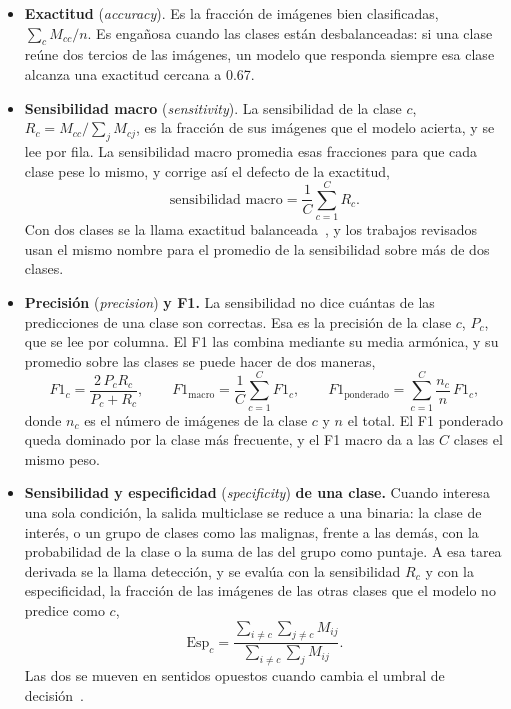 \begin{itemize}
    \item \textbf{Exactitud} (\emph{accuracy}). Es la fracción de imágenes bien clasificadas, $\sum_c M_{cc} / n$.
    Es engañosa
    cuando las clases están desbalanceadas: si una clase reúne dos tercios de las imágenes, un modelo que responda
    siempre esa clase alcanza una exactitud cercana a 0.67.

    \item \textbf{Sensibilidad macro} (\emph{sensitivity}). La sensibilidad de la clase $c$,
    $R_c = M_{cc} / \sum_{j} M_{cj}$, es la
    fracción de sus imágenes que el modelo acierta, y se lee por fila. La sensibilidad macro promedia esas
    fracciones para que cada clase pese lo mismo, y corrige así el defecto de la exactitud,
    \begin{equation}
        \text{sensibilidad macro} = \frac{1}{C}\sum_{c=1}^{C} R_c.
        \label{eq:marco_acc_bal}
    \end{equation}
    Con dos clases se la llama exactitud balanceada~\cite{brodersen2010balanced,sokolova2009systematic}, y los trabajos revisados usan el mismo nombre para el promedio de la sensibilidad sobre más de dos clases.

    \item \textbf{Precisión} (\emph{precision}) \textbf{y F1.} La sensibilidad no dice cuántas de las predicciones
    de una clase son correctas. Esa es la precisión de la clase $c$, $P_c$, que se lee por columna. El F1 las
    combina mediante su media armónica, y su promedio sobre las clases se puede hacer de dos maneras,
    \begin{equation}
        F1_c = \frac{2\,P_c R_c}{P_c + R_c}, \qquad
        F1_{\text{macro}} = \frac{1}{C}\sum_{c=1}^{C} F1_c, \qquad
        F1_{\text{ponderado}} = \sum_{c=1}^{C} \frac{n_c}{n}\, F1_c,
        \label{eq:marco_f1}
    \end{equation}
    donde $n_c$ es el número de imágenes de la clase $c$ y $n$ el total. El F1 ponderado queda dominado por la
    clase más frecuente, y el F1 macro da a las $C$ clases el mismo peso.

    \item \textbf{Sensibilidad y especificidad} (\emph{specificity}) \textbf{de una clase.} Cuando interesa una
    sola condición, la salida multiclase se reduce a una binaria: la clase de interés, o un grupo de clases como las malignas, frente a
    las demás, con la probabilidad de la clase o la suma de las del grupo como puntaje. A esa tarea derivada se
    la llama detección, y se evalúa con la sensibilidad $R_c$ y con la especificidad, la fracción de las imágenes
    de las otras clases que el modelo no predice como $c$,
    \begin{equation}
        \mathrm{Esp}_c = \frac{\sum_{i \neq c}\sum_{j \neq c} M_{ij}}{\sum_{i \neq c}\sum_{j} M_{ij}}.
        \label{eq:marco_sens_esp}
    \end{equation}
    Las dos se mueven en sentidos opuestos cuando cambia el umbral de decisión~\cite{fawcett2006introduction}.


\end{itemize}
